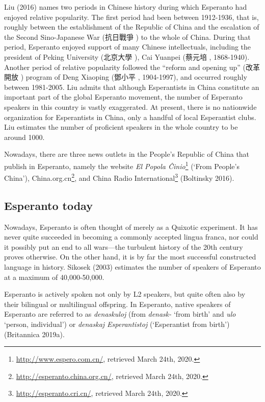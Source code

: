 Liu (2016) names two periods in Chinese history during which Esperanto had enjoyed relative popularity.
The first period had been between 1912-1936, that is, roughly between the establishment of the Republic of China and the escalation of the Second Sino-Japanese War (抗日戰爭 ) to the whole of China.
During that period, Esperanto enjoyed support of many Chinese intellectuals, including the president of Peking University (北京大學 ), Cai Yuanpei (蔡元培 , 1868-1940).
Another period of relative popularity followed the ``reform and opening up'' (改革開放 ) program of Deng Xiaoping (鄧小平 , 1904-1997), and occurred roughly between 1981-2005.
Liu admits that although Esperantists in China constitute an important part of the global Esperanto movement, the number of Esperanto speakers in this country is vastly exaggerated.
At present, there is no nationwide organization for Esperantists in China, only a handful of local Esperantist clubs.
Liu estimates the number of proficient speakers in the whole country to be around 1000.

Nowadays, there are three news outlets in the People's Republic of China that publish in Esperanto, namely the website \textit{El Popola Ĉinio}\footnote{\url{http://www.espero.com.cn/}, retrieved March 24th, 2020.} (`From People's China'), China.org.cn\footnote{\url{http://esperanto.china.org.cn/}, retrieved March 24th, 2020.},
and China Radio International\footnote{\url{http://esperanto.cri.cn/}, retrieved March 24th, 2020.}
(Boltinsky 2016).

\subsection{Esperanto today}
Nowadays, Esperanto is often thought of merely as a Quixotic experiment.
It has never quite succeeded in becoming a commonly accepted lingua franca, nor could it possibly put an end to all wars---the turbulent history of the 20th century proves otherwise.
On the other hand, it is by far the most successful constructed language in history.
Sikosek (2003) estimates the number of speakers of Esperanto at a maximum of 40,000-50,000.

Esperanto is actively spoken not only by L2 speakers, but quite often also by their bilingual or multilingual offspring.
In Esperanto, native speakers of Esperanto are referred to as \textit{denaskuloj} (from \textit{denask-} `from birth' and \textit{ulo} `person, individual') or \textit{denaskaj Esperantistoj} (`Esperantist from birth')
(Britannica 2019a).

